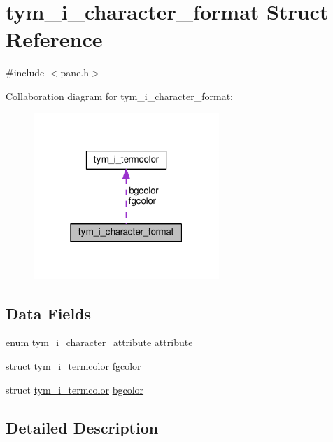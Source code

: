 \hypertarget{structtym__i__character__format}{}\section{tym\+\_\+i\+\_\+character\+\_\+format Struct Reference}
\label{structtym__i__character__format}


{\ttfamily \#include $<$pane.\+h$>$}



Collaboration diagram for tym\+\_\+i\+\_\+character\+\_\+format\+:
\nopagebreak
\begin{figure}[H]
\begin{center}
\leavevmode
\includegraphics[width=199pt]{structtym__i__character__format__coll__graph}
\end{center}
\end{figure}
\subsection*{Data Fields}
\begin{DoxyCompactItemize}
\item 
enum \hyperlink{pane_8h_ac6609b89967e8b2b9e46a1630a260654}{tym\+\_\+i\+\_\+character\+\_\+attribute} \hyperlink{structtym__i__character__format_a276bf9587b4bdad1f8a3c0cefe42e9ae}{attribute}
\item 
struct \hyperlink{structtym__i__termcolor}{tym\+\_\+i\+\_\+termcolor} \hyperlink{structtym__i__character__format_acf1b3f3b19b6807936d8cc633b8fdb0e}{fgcolor}
\item 
struct \hyperlink{structtym__i__termcolor}{tym\+\_\+i\+\_\+termcolor} \hyperlink{structtym__i__character__format_afa091652fea5f7d0729d18fb4a8f984f}{bgcolor}
\end{DoxyCompactItemize}


\subsection{Detailed Description}


